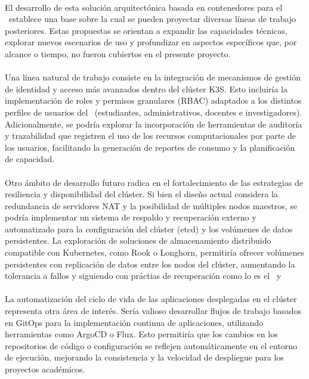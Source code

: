 \label{cap:trabajos-futuros}
\mbox{}\\
El desarrollo de esta solución arquitectónica basada en contenedores para el \GRID\ establece una base sobre la cual se pueden proyectar diversas líneas de trabajo posteriores. Estas propuestas se orientan a expandir las capacidades técnicas, explorar nuevos escenarios de uso y profundizar en aspectos específicos que, por alcance o tiempo, no fueron cubiertos en el presente proyecto. \\ \\
\noindent
Una línea natural de trabajo consiste en la integración de mecanismos de gestión de identidad y acceso más avanzados dentro del clúster K3S. Esto incluiría la implementación de roles y permisos granulares (RBAC) adaptados a los distintos perfiles de usuarios del \GRID\ (estudiantes, administrativos, docentes e investigadores). Adicionalmente, se podría explorar la incorporación de herramientas de auditoría y trazabilidad que registren el uso de los recursos computacionales por parte de los usuarios, facilitando la generación de reportes de consumo y la planificación de capacidad. \\ \\
\noindent
Otro ámbito de desarrollo futuro radica en el fortalecimiento de las estrategias de resiliencia y disponibilidad del clúster. Si bien el diseño actual considera la redundancia de servidores NAT y la posibilidad de múltiples nodos maestros, se podría implementar un sistema de respaldo y recuperación externo y automatizado para la configuración del clúster (etcd) y los volúmenes de datos persistentes. La exploración de soluciones de almacenamiento distribuido compatible con Kubernetes, como Rook o Longhorn, permitiría ofrecer volúmenes persistentes con replicación de datos entre los nodos del clúster, aumentando la tolerancia a fallos y siguiendo con práctias de recuperación como lo es el \RPO\ y \RTO\. \\ \\
\noindent
La automatización del ciclo de vida de las aplicaciones desplegadas en el clúster representa otra área de interés. Sería valioso desarrollar flujos de trabajo basados en GitOps para la implementación continua de aplicaciones, utilizando herramientas como ArgoCD o Flux. Esto permitiría que los cambios en los repositorios de código o configuración se reflejen automáticamente en el entorno de ejecución, mejorando la consistencia y la velocidad de despliegue para los proyectos académicos.\\ \\
